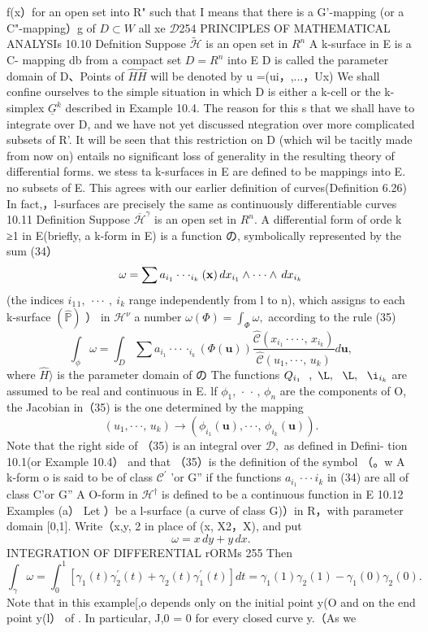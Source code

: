 f(x）for an open set into R" such that I means that there is a G'-mapping (or a C"-mapping）g of $D\subset W$ all xe ${\mathcal{D}}$254 PRINCIPLES OF MATHEMATICAL ANALYSIs 10.10 Defnition Suppose ${\widetilde{\mathcal{H}}}$ is an open set in $R^{n}$ A k-surface in E is a C- mapping db from a compact set $\scriptstyle{D={R^{n}}}$ into E D is called the parameter domain of D、Points of ${\hat{H}}{\hat{H}}$ will be denoted by u =(ui，,...，Ux) We shall confine ourselves to the simple situation in which D is either a k-cell or the k-simplex $\underline{{{G}}}^{k}$ described in Example 10.4. The reason for this s that we shall have to integrate over D, and we have not yet discussed ntegration over more complicated subsets of R'. It will be seen that this restriction on D (which wil be tacitly made from now on) entails no significant loss of generality in the resulting theory of differential forms. we stess ta k-surfaces in E are defined to be mappings into E. no subsets of E. This agrees with our earlier definition of curves(Definition 6.26) In fact,，l-surfaces are precisely the same as continuously differentiable curves 10.11 Definition Suppose ${\overline{{\mathcal{H}}}}^{\gamma}$ is an open set in $\textstyle R^{n}\!.$ A differential form of orde k ≥1 in E(briefly, a k-form in E) is a function の, symbolically represented by the sum (34） $$ \omega=\sum a_{i_{1}}\cdot\cdot\cdot_{i_{k}}({\bf x})\,d x_{i_{1}}\wedge\cdot\cdot\cdot\wedge\,d x_{i_{k}} $$ (the indices $i_{1}\!_{}^{}_{\!1}\!,\ \cdot\cdot\cdot\ ,\ i_{k}$ range independently from l to n), which assigns to each k-surface $({\hat{\mathbb{P}}})$ ） in ${\mathcal{H}}^{\nu}$ a number $\omega(\Phi)=\int_{\Phi}\omega,$ according to the rule (35) $$ \int_{\phi}\omega=\int_{D}\sum a_{i_{1}}\cdot\cdot\cdot\cdot_{i_{k}}(\Phi(\mathbf{u})){\frac{\hat{\mathcal{C}}(x_{i_{1}}\cdot\cdot\cdot\cdot,\,x_{i_{k}})}{\hat{\mathcal{C}}(u_{1},\cdot\cdot\cdot,\,u_{k})}}d\mathbf{u}, $$ where ${\hat{H}}\rangle$ is the parameter domain of の The functions $Q_{i_{1}}\ \ ,\ \L,\ \ \L,\ \ \i_{i_{k}}$ are assumed to be real and continuous in E. lf $\phi_{1},\,\cdot\,\cdot\,,\,\phi_{n}$ are the components of O, the Jacobian in（35) is the one determined by the mapping $$ (u_{1},\cdot\cdot\cdot,\,u_{k})\to(\phi_{i_{1}}(\mathbf{u}),\cdot\cdot\cdot,\,\phi_{i_{k}}(\mathbf{u})). $$ Note that the right side of （35) is an integral over ${\mathcal{D}},$ as defined in Defini- tion 10.1(or Example 10.4） and that （35）is the definition of the symbol （。w A k-form o is said to be of class $\mathcal{C}^{\prime}$ ’or G” if the functions $a_{i_{1}}\cdot\cdot\cdot i_{k}$ in (34) are all of class C’or G” A O-form in ${\mathcal{H}}^{\dagger}$ is defined to be a continuous function in E 10.12 Examples (a） Let ）be a l-surface (a curve of class G)）in R，with parameter domain [0,1]. Write（x,y, 2 in place of (x, X2，X), and put $$ \omega=x\,d y+y\,d x. $$INTEGRATION OF DIFFERENTIAL rORMs 255 Then $$ \int_{\gamma}\omega=\int_{0}^{1}\left[\gamma_{1}(t)\gamma_{2}^{\prime}(t)+\gamma_{2}(t)\gamma_{1}^{\prime}(t)\right]d t=\gamma_{1}(1)\gamma_{2}(1)-\gamma_{1}(0)\gamma_{2}(0). $$ Note that in this example[,o depends only on the initial point y(O and on the end point y(l） of . In particular, J,0 = 0 for every closed curve y.（As we 